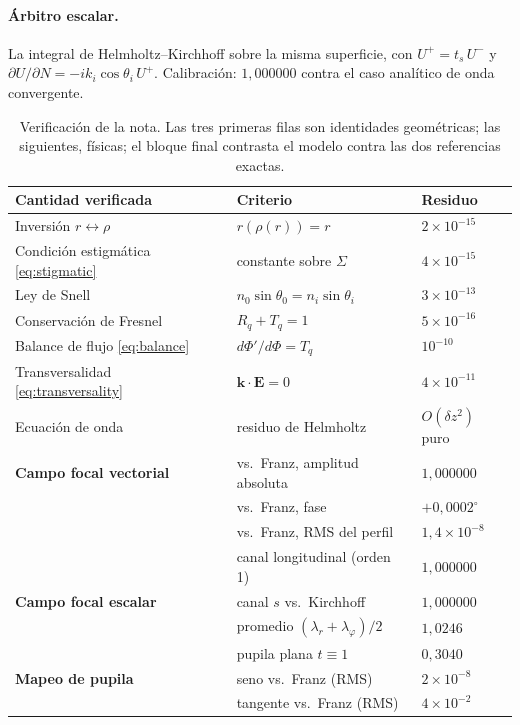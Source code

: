 \documentclass[11pt,a4paper]{article}
\newcommand{\E}{\mathbf{E}}
\begin{document}
\paragraph{Árbitro escalar.} La integral de Helmholtz--Kirchhoff sobre la misma
superficie, con $U^+=t_s\,U^-$ y
$\partial U/\partial N=-ik_i\cos\theta_i\,U^+$. Calibración: $1{,}000000$
contra el caso analítico de onda convergente.

\begin{table}[htbp]
\centering
\small
\begin{tabular}{lll}
\toprule
Cantidad verificada & Criterio & Residuo \\
\midrule
Inversión $r\leftrightarrow\rho$ & $r(\rho(r))=r$ & $2\times10^{-15}$ \\
Condición estigmática \eqref{eq:stigmatic} & constante sobre $\Sigma$ & $4\times10^{-15}$ \\
Ley de Snell & $n_0\sin\theta_0=n_i\sin\theta_i$ & $3\times10^{-13}$ \\
Conservación de Fresnel & $R_q+T_q=1$ & $5\times10^{-16}$ \\
Balance de flujo \eqref{eq:balance} & $d\Phi'/d\Phi=T_q$ & $10^{-10}$ \\
Transversalidad \eqref{eq:transversality} & $\mathbf{k}\cdot\E=0$ & $4\times10^{-11}$ \\
Ecuación de onda & residuo de Helmholtz & $O(\delta z^2)$ puro \\
\midrule
\textbf{Campo focal vectorial} & vs.\ Franz, amplitud absoluta & $1{,}000000$ \\
 & vs.\ Franz, fase & $+0{,}0002^\circ$ \\
 & vs.\ Franz, RMS del perfil & $1{,}4\times10^{-8}$ \\
 & canal longitudinal (orden 1) & $1{,}000000$ \\
\midrule
\textbf{Campo focal escalar} & canal $s$ vs.\ Kirchhoff & $1{,}000000$ \\
 & promedio $(\lambda_r+\lambda_\varphi)/2$ & $1{,}0246$ \\
 & pupila plana $t\equiv1$ & $0{,}3040$ \\
\midrule
\textbf{Mapeo de pupila} & seno vs.\ Franz (RMS) & $2\times10^{-8}$ \\
 & tangente vs.\ Franz (RMS) & $4\times10^{-2}$ \\
\bottomrule
\end{tabular}
\caption{Verificación de la nota. Las tres primeras filas son identidades
geométricas; las siguientes, físicas; el bloque final contrasta el modelo
contra las dos referencias exactas.}
\end{table}
\end{document}
